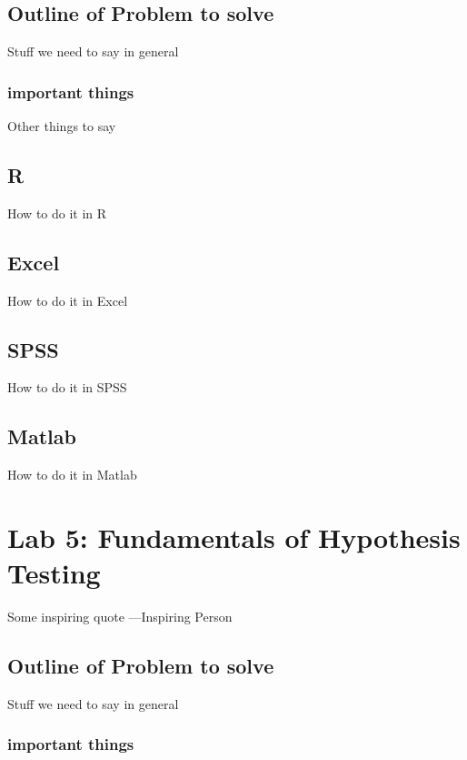 \documentclass[]{book}
\theoremstyle{definition}
\theoremstyle{definition}
\theoremstyle{definition}
\theoremstyle{remark}
\begin{document}
\section{Outline of Problem to
solve}\label{outline-of-problem-to-solve-2}

Stuff we need to say in general

\subsection{important things}\label{important-things-2}

Other things to say

\section{R}\label{r-4}

How to do it in R

\section{Excel}\label{excel-3}

How to do it in Excel

\section{SPSS}\label{spss-3}

How to do it in SPSS

\section{Matlab}\label{matlab-3}

How to do it in Matlab

\chapter{Lab 5: Fundamentals of Hypothesis
Testing}\label{lab-5-fundamentals-of-hypothesis-testing}

{ Some inspiring quote ---Inspiring Person }

\section{Outline of Problem to
solve}\label{outline-of-problem-to-solve-3}

Stuff we need to say in general

\subsection{important things}\label{important-things-3}
\end{document}
